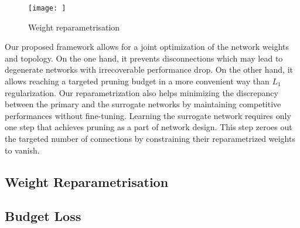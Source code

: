 \begin{figure}[h]
    \centering
    \texttt{[image: ]}
    \caption{Weight reparametrisation}
    \label{fig:reparametrisation}
\end{figure}

Our proposed framework allows for a joint optimization of the network weights
and topology. On the one hand, it prevents disconnections which may lead to
degenerate networks with irrecoverable performance drop. On the other hand, it
allows reaching a targeted pruning budget in a more convenient way than $L_1$
regularization. Our reparametrization also helps minimizing the discrepancy
between the primary and the surrogate networks by maintaining competitive
performances without fine-tuning. Learning the surrogate network requires only
one step that achieves pruning as a part of network design. This step zeroes out
the targeted number of connections by constraining their reparametrized weights
to vanish.

\subsection{Weight Reparametrisation}

\subsection{Budget Loss}
